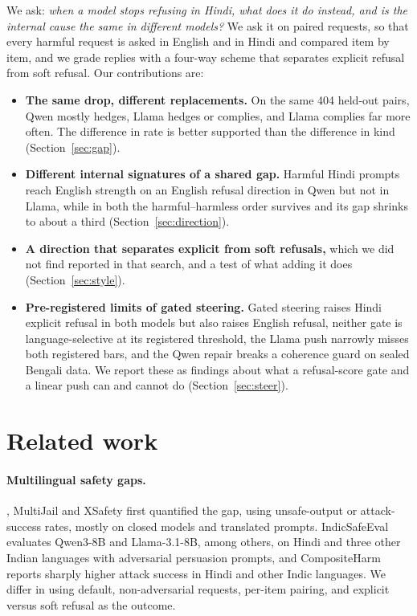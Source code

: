 \documentclass[11pt]{article}
\begin{document}
We ask: \emph{when a model stops refusing in Hindi, what does it do instead, and is the internal cause the same in different models?} We ask it on paired requests, so that every harmful request is asked in English and in Hindi and compared item by item, and we grade replies with a four-way scheme that separates explicit refusal from soft refusal. Our contributions are:
\begin{itemize}
\item \textbf{The same drop, different replacements.} On the same 404 held-out pairs, Qwen mostly hedges, Llama hedges or complies, and Llama complies far more often. The difference in rate is better supported than the difference in kind (Section~\ref{sec:gap}).
\item \textbf{Different internal signatures of a shared gap.} Harmful Hindi prompts reach English strength on an English refusal direction in Qwen but not in Llama, while in both the harmful--harmless order survives and its gap shrinks to about a third (Section~\ref{sec:direction}).
\item \textbf{A direction that separates explicit from soft refusals,} which we did not find reported in that search, and a test of what adding it does (Section~\ref{sec:style}).
\item \textbf{Pre-registered limits of gated steering.} Gated steering raises Hindi explicit refusal in both models but also raises English refusal, neither gate is language-selective at its registered threshold, the Llama push narrowly misses both registered bars, and the Qwen repair breaks a coherence guard on sealed Bengali data. We report these as findings about what a refusal-score gate and a linear push can and cannot do (Section~\ref{sec:steer}).
\end{itemize}

\section{Related work}
\paragraph{Multilingual safety gaps.} \citet{yong2023lowresource}, MultiJail \citep{deng2024multijail} and XSafety \citep{wang2024xsafety} first quantified the gap, using unsafe-output or attack-success rates, mostly on closed models and translated prompts. IndicSafeEval \citep{mondal2026indicsafeeval} evaluates Qwen3-8B and Llama-3.1-8B, among others, on Hindi and three other Indian languages with adversarial persuasion prompts, and CompositeHarm \citep{shukla2026composite} reports sharply higher attack success in Hindi and other Indic languages. We differ in using default, non-adversarial requests, per-item pairing, and explicit versus soft refusal as the outcome.
\end{document}
